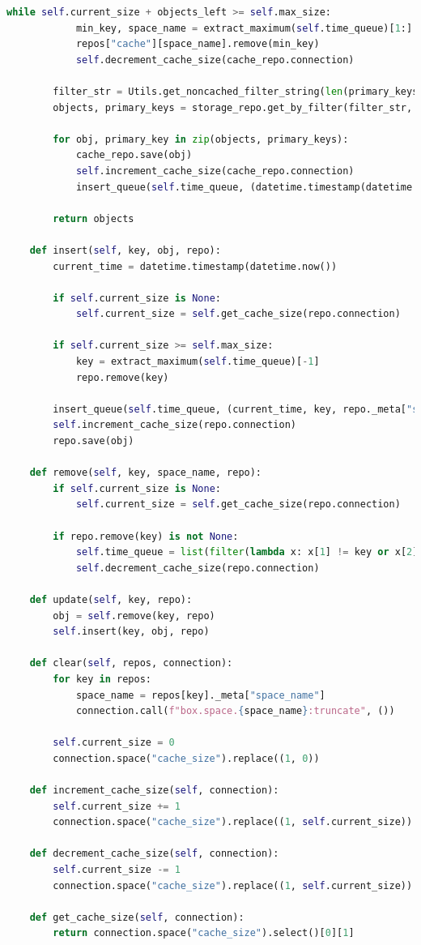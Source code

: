 \begin{lstlisting}[label=lst:cache, caption=Листинг модуля кэширования данных с политикой вытеснения LRU, language=python]
		while self.current_size + objects_left >= self.max_size:
			min_key, space_name = extract_maximum(self.time_queue)[1:]
			repos["cache"][space_name].remove(min_key)
			self.decrement_cache_size(cache_repo.connection)

		filter_str = Utils.get_noncached_filter_string(len(primary_keys), index)
		objects, primary_keys = storage_repo.get_by_filter(filter_str, tuple(map(int, [key] + primary_keys)))

		for obj, primary_key in zip(objects, primary_keys):
			cache_repo.save(obj)
			self.increment_cache_size(cache_repo.connection)
			insert_queue(self.time_queue, (datetime.timestamp(datetime.now()), primary_key, space_name))

		return objects

	def insert(self, key, obj, repo):
		current_time = datetime.timestamp(datetime.now())

		if self.current_size is None:
			self.current_size = self.get_cache_size(repo.connection)

		if self.current_size >= self.max_size:
			key = extract_maximum(self.time_queue)[-1]
			repo.remove(key)

		insert_queue(self.time_queue, (current_time, key, repo._meta["space_name"]))
		self.increment_cache_size(repo.connection)
		repo.save(obj)

	def remove(self, key, space_name, repo):
		if self.current_size is None:
			self.current_size = self.get_cache_size(repo.connection)

		if repo.remove(key) is not None:
			self.time_queue = list(filter(lambda x: x[1] != key or x[2] != space_name, self.time_queue))
			self.decrement_cache_size(repo.connection)

	def update(self, key, repo):
		obj = self.remove(key, repo)
		self.insert(key, obj, repo)

	def clear(self, repos, connection):
		for key in repos:
			space_name = repos[key]._meta["space_name"]
			connection.call(f"box.space.{space_name}:truncate", ())

		self.current_size = 0
		connection.space("cache_size").replace((1, 0))

	def increment_cache_size(self, connection):
		self.current_size += 1
		connection.space("cache_size").replace((1, self.current_size))

	def decrement_cache_size(self, connection):
		self.current_size -= 1
		connection.space("cache_size").replace((1, self.current_size))

	def get_cache_size(self, connection):
		return connection.space("cache_size").select()[0][1]
\end{lstlisting}

